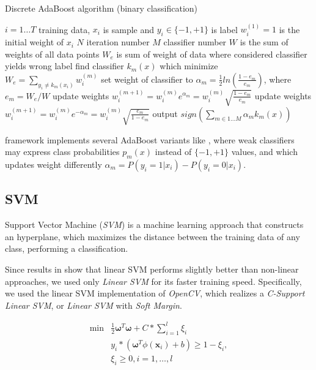 \begin{algorithm}
\caption{Discrete AdaBoost algorithm (binary classification)} 
\label{alg:adaboost}
\begin{algorithmic}
\STATE $i=1 \ldots T$ training data, $x_i$ is sample and $y_i \in \{-1,+1\}$ is label
\STATE $w_{i}^{(1)}=1$ is the initial weight of $x_i$
\STATE $N$ iteration number
\STATE $M$ classifier number
\STATE $W$ is the sum of weights of all data points
\STATE $W_e$ is sum of weight of data where considered classifier yields wrong label
		\STATE find classifier $k_{m}(x)$ which minimize $W_e=\sum_{y_i \neq k_m(x_i)}{w_{i}^{(m)}}$
		\STATE set weight of classifier to $\alpha_{m}=\frac{1}{2}ln(\frac{1-e_m}{e_m}) $, where $e_m=W_e/W$
	 		\STATE update weights $w_{i}^{(m+1)}=w_{i}^{(m)}e^{\alpha_m}=w_{i}^{(m)}\sqrt{\frac{1-e_m}{e_m}}$
		\ELSE
			\STATE update weights $w_{i}^{(m+1)}=w_{i}^{(m)}e^{-\alpha_m}=w_{i}^{(m)}\sqrt{\frac{e_m}{1-e_m}}$
 		\ENDIF
\STATE output $sign( \sum_{m \in 1 \ldots M}{ \alpha_m k_m (x)} )$
\ENDFOR
\end{algorithmic}
\end{algorithm}

 framework implements several AdaBoost variants like , where weak classifiers may express class probabilities $p_m(x)$ instead of $\{-1,+1\}$ values, and  which updates weight differently $\alpha_{m}=P(y_i=1|x_i)-P(y_i=0|x_i)$. 


\subsection{SVM}

Support Vector Machine (\emph{SVM}) is a machine learning approach that
 constructs an hyperplane, which maximizes the distance between the training
 data of any class, performing a classification.
 
 Since results in \cite{Littlewort04dynamicsof} show that linear SVM performs
 slightly better than non-linear approaches, we used only \emph{Linear SVM} for
 its faster training speed. Specifically, we used the linear SVM implementation
 of \emph{OpenCV}, which realizes a \emph{C-Support Linear SVM}, or \emph{Linear
 SVM} with \emph{Soft Margin}.
 
 \begin{align}
   \min & \frac{1}{2} \boldsymbol{\omega}^T \boldsymbol{\omega} + C*\sum_{i=1}^l \xi_i\\
   & y_i * (\boldsymbol{\omega}^T \phi(\textbf{x}_i) + b) \geq 1 - \xi_i,\\
   & \xi_i \geq 0, i = 1, \dots, l
   \label{mt:lin_svm}
 \end{align}
 
